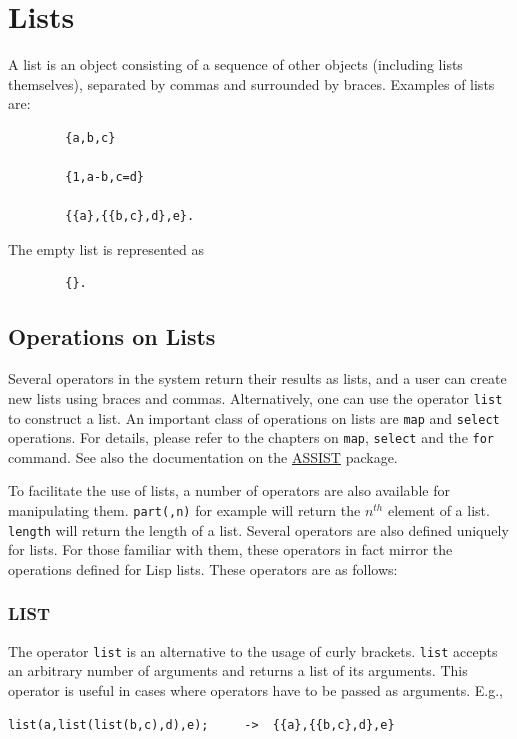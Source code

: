 \chapter{Lists}

A list is an object consisting of a sequence of other objects
(including lists themselves), separated by commas and surrounded by
braces.  Examples of lists are:
\begin{verbatim}
        {a,b,c}

        {1,a-b,c=d}

        {{a},{{b,c},d},e}.
\end{verbatim}
The empty list is represented as
\begin{verbatim}
        {}.
\end{verbatim}

\section{Operations on Lists}

Several operators in the system return their results as lists, and a user
can create new lists using braces and commas.  Alternatively, one can use
the operator \texttt{list} to construct a list.  An important class of operations
on lists are \texttt{map} and \texttt{select} operations.  For details, please refer to the
chapters on \texttt{map}, \texttt{select} and the \texttt{for} command.  See also the documentation
on the \hyperlink{ASSIST}{ASSIST} package.

To facilitate the use of
lists, a number of operators are also available for manipulating
them.
\texttt{part(,n)} for example will return the
$n^{th}$ element of a list.
\texttt{length} will return the
length of a list.  Several operators are also defined uniquely for lists.
For those familiar with them, these operators in fact mirror the
operations defined for Lisp lists.  These operators are as follows:

\subsection{LIST}
\hypertarget{operator:LIST}{}

The operator \texttt{list} is an alternative to the usage of curly brackets. \texttt{list}
accepts an arbitrary number of arguments and returns a list
of its arguments. This operator is useful in cases where operators
have to be passed as arguments. E.g.,
\begin{verbatim}
list(a,list(list(b,c),d),e);     ->  {{a},{{b,c},d},e}
\end{verbatim}


